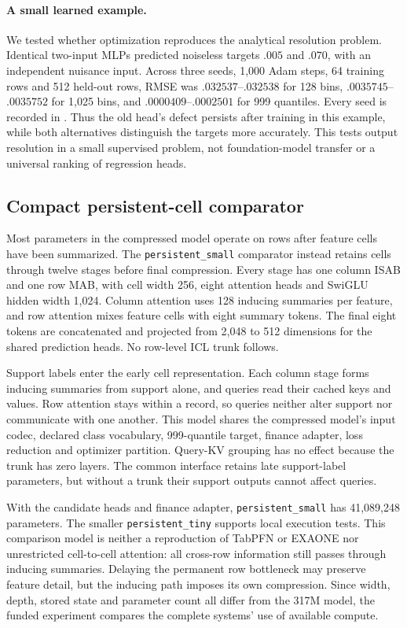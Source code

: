 \documentclass[11pt]{article}
\begin{document}
\paragraph{A small learned example.} We tested whether optimization reproduces the analytical resolution problem. Identical two-input MLPs predicted noiseless targets $.005$ and $.070$, with an independent nuisance input. Across three seeds, 1,000 Adam steps, 64 training rows and 512 held-out rows, RMSE was $.032537$--$.032538$ for 128 bins, $.0035745$--$.0035752$ for 1,025 bins, and $.0000409$--$.0002501$ for 999 quantiles. Every seed is recorded in . Thus the old head's defect persists after training in this example, while both alternatives distinguish the targets more accurately. This tests output resolution in a small supervised problem, not foundation-model transfer or a universal ranking of regression heads.

\subsection{Compact persistent-cell comparator}
\label{sec:persistent-comparator}

Most parameters in the compressed model operate on rows after feature cells have been summarized. The \texttt{persistent\_small} comparator instead retains cells through twelve stages before final compression. Every stage has one column ISAB and one row MAB, with cell width 256, eight attention heads and SwiGLU hidden width 1,024. Column attention uses 128 inducing summaries per feature, and row attention mixes feature cells with eight summary tokens. The final eight tokens are concatenated and projected from 2,048 to 512 dimensions for the shared prediction heads. No row-level ICL trunk follows.

Support labels enter the early cell representation. Each column stage forms inducing summaries from support alone, and queries read their cached keys and values. Row attention stays within a record, so queries neither alter support nor communicate with one another. This model shares the compressed model's input codec, declared class vocabulary, 999-quantile target, finance adapter, loss reduction and optimizer partition. Query-KV grouping has no effect because the trunk has zero layers. The common interface retains late support-label parameters, but without a trunk their support outputs cannot affect queries.

With the candidate heads and finance adapter, \texttt{persistent\_small} has 41,089,248 parameters. The smaller \texttt{persistent\_tiny} supports local execution tests. This comparison model is neither a reproduction of TabPFN or EXAONE nor unrestricted cell-to-cell attention: all cross-row information still passes through inducing summaries. Delaying the permanent row bottleneck may preserve feature detail, but the inducing path imposes its own compression. Since width, depth, stored state and parameter count all differ from the 317M model, the funded experiment compares the complete systems' use of available compute.
\end{document}
